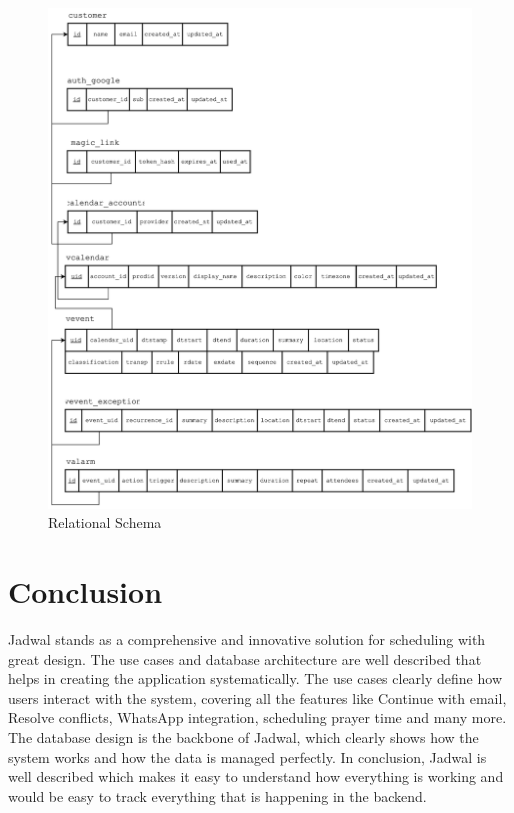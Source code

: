 \documentclass[12pt,a4paper]{report}
\begin{document}
\begin{figure}[!h]
    \centering
    \includegraphics[width=\textwidth]{images/database-schema.png}
    \caption{Relational Schema}
    \label{fig:relational-schema}
\end{figure}




\section{Conclusion}

Jadwal stands as a comprehensive and innovative solution for scheduling with great design. The use cases and database architecture are well described that helps in creating the application systematically. The use cases clearly define how users interact with the system, covering all the features like Continue with email, Resolve conflicts, WhatsApp integration, scheduling prayer time and many more. The database design is the backbone of Jadwal, which clearly shows how the system works and how the data is managed perfectly. In conclusion, Jadwal is well described which makes it easy to understand how everything is working and would be easy to track everything that is happening in the backend.
\end{document}
